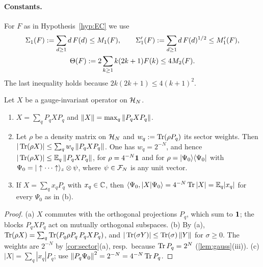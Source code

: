 \paragraph{Constants.}  For $F$ as in Hypothesis~\ref{hyp:EC} we use
\begin{equation}\label{eq:main-constants}
\begin{gathered}
  \Sigma_1(F):=\sum_{d\ge1}d\,F(d)\le M_1(F),\qquad
  \Sigma_1'(F):=\sum_{d\ge1}d\,F(d)^{1/2}\le M'_1(F),\\
  \Theta(F):=2\sum_{k\ge1}k(2k+1)F(k)\le4M_2(F).
\end{gathered}
\end{equation}
The last inequality holds because $2k(2k+1)\le4(k+1)^2$.

\begin{lemma}\label{lem:sectornorm}
Let $X$ be a gauge-invariant operator on $\mathcal{H}_N$.
\begin{enumerate}[label=(\alph*)]
\item $X=\sum_qP_qXP_q$ and $\left\|X\right\|=\max_q\left\|P_qXP_q\right\|$.
\item Let $\rho$ be a density matrix on $\mathcal{H}_N$ and $w_q:=\operatorname{Tr}(\rho P_q)$ its sector weights.  Then
$|\operatorname{Tr}(\rho X)|\le\sum_qw_q\left\|P_qXP_q\right\|$.  One has $w_q=2^{-N}$, and hence
$|\operatorname{Tr}(\rho X)|\le\mathbb{E}_q\left\|P_qXP_q\right\|$, for $\rho=4^{-N}\mathbf{1}$ and for $\rho=|\Psi_0\rangle\langle \Psi_0|$ with
$\Psi_0=|\uparrow\cdots\uparrow\rangle_z\otimes\psi$, where $\psi\in\mathcal{F}_N$ is any unit vector.
\item If $X=\sum_qx_qP_q$ with $x_q\in\mathbb{C}$, then
$\langle\Psi_0,|X|\Psi_0\rangle=4^{-N}\operatorname{Tr}|X|=\mathbb{E}_q|x_q|$ for every $\Psi_0$ as in (b).
\end{enumerate}
\end{lemma}

\begin{proof}
(a) $X$ commutes with the orthogonal projections $P_q$, which sum to $\mathbf{1}$; the blocks $P_qXP_q$ act on
mutually orthogonal subspaces.  (b) By (a), $\operatorname{Tr}(\rho X)=\sum_q\operatorname{Tr}(P_q\rho P_q\,P_qXP_q)$, and
$|\operatorname{Tr}(\sigma Y)|\le\operatorname{Tr}(\sigma)\left\|Y\right\|$ for $\sigma\ge0$.  The weights are $2^{-N}$ by
\cref{cor:sector}(a), resp.\ because $\operatorname{Tr} P_q=2^N$ (\cref{lem:gauss}(iii)).  (c) $|X|=\sum_q|x_q|P_q$; use
$\left\|P_q\Psi_0\right\|^2=2^{-N}=4^{-N}\operatorname{Tr} P_q$.
\end{proof}


